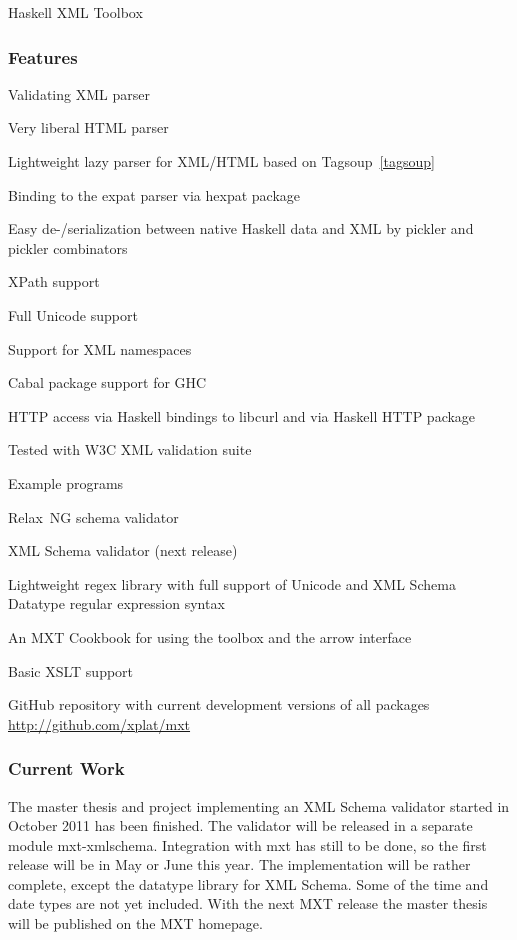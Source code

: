 \begin{hcarentry}[updated]{Haskell XML Toolbox}
\subsubsection*{Features}

\begin{compactitem}
\item Validating XML parser
\item Very liberal HTML parser
\item Lightweight lazy parser for XML/HTML based on Tagsoup~\cref{tagsoup}
\item Binding to the expat parser via hexpat package
\item Easy de-/serialization between native Haskell data and XML by pickler and pickler combinators
\item XPath support
\item Full Unicode support
\item Support for XML namespaces
\item Cabal package support for GHC
\item HTTP access via Haskell bindings to libcurl and via Haskell HTTP
  package
\item Tested with W3C XML validation suite
\item Example programs
\item Relax~NG schema validator
\item XML Schema validator (next release)
\item Lightweight regex library with full support of Unicode and XML Schema
  Datatype regular expression syntax
\item An MXT Cookbook for using the toolbox and the arrow interface
\item Basic XSLT support
\item GitHub repository with current development versions of all packages
  \url{http://github.com/xplat/mxt}
\end{compactitem}

\subsubsection*{Current Work}

The master thesis and project implementing an XML Schema validator
started in October 2011 has been finished. The validator will be released
in a separate module mxt-xmlschema. Integration with mxt has still to be done,
so the first release will be in May or June this year.
The implementation will be rather complete, except the datatype library
for XML Schema. Some of the time and date types are not yet included.
With the next MXT release the master thesis will be published on the MXT homepage.


\end{hcarentry}
